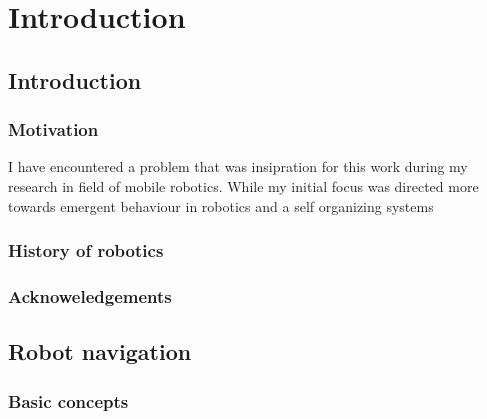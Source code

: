 \setchapterpreamble[u]{\margintoc}
\chapter[Introduction]{Introduction\footnotemark[0]}


\section{Introduction}

\subsection{Motivation}
I have encountered a problem that was insipration for this work during my research in field
of mobile robotics. While my initial focus was directed more towards emergent behaviour in 
robotics and a self organizing systems 


\subsection{History of robotics}

\subsection{Acknoweledgements}

\section{Robot navigation}

\subsection{Basic concepts}


